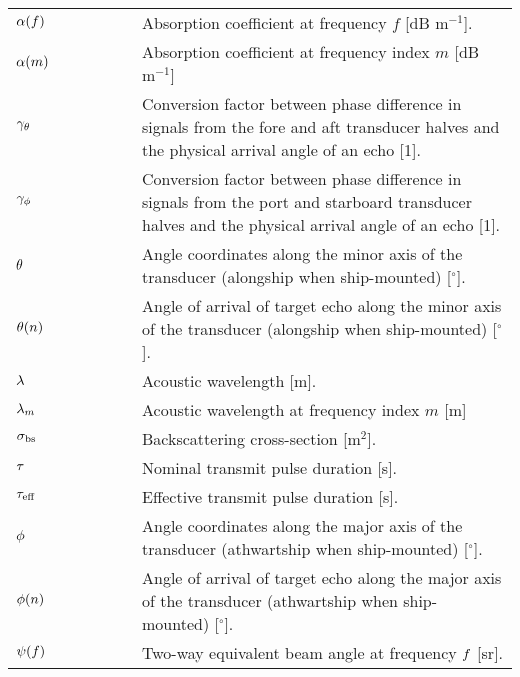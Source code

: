 \documentclass[preprint,12pt,TurnOnLineNumbers]{JASAnew}
\begin{document}
\begin{longtable}{p{0.25\linewidth} p{0.75\linewidth}}
$\alpha(f)$  & Absorption coefficient at frequency $f$ [dB $\textrm{m}^{-1}$].\\
$\alpha(m)$ & Absorption coefficient at frequency index $m$ [dB $\textrm{m}^{-1}$]\\
$\gamma_\theta$ & Conversion factor between phase difference in signals from the fore and aft transducer halves and the physical arrival angle of an echo [1].\\
$\gamma_\phi$ & Conversion factor between phase difference in signals from the port and starboard transducer halves and the physical arrival angle of an echo [1].\\
$\theta$ & Angle coordinates along the minor axis of the transducer (alongship when ship-mounted) [$^\circ$].\\
$\theta(n)$ & Angle of arrival of target echo along the minor axis of the transducer (alongship when ship-mounted) [$^\circ$].\\
$\lambda$ &  Acoustic wavelength [m].\\
$\lambda_m$ & Acoustic wavelength at frequency index $m$ [m]\\
$\sigma_{\textrm{bs}}$ & Backscattering cross-section [$\textrm{m}^2$].\\
$\tau$ & Nominal transmit pulse duration [s].\\
$\tau_{\textrm{eff}}$ & Effective transmit pulse duration [s].\\
$\phi$ & Angle coordinates along the major axis of the transducer (athwartship when ship-mounted) [$^\circ$].\\
$\phi(n)$ & Angle of arrival of target echo along the major axis of the transducer (athwartship when ship-mounted) [$^\circ$].\\
$\psi(f)$ & Two-way equivalent beam angle at frequency $f$ [sr].\\
\end{longtable}
\end{document}
